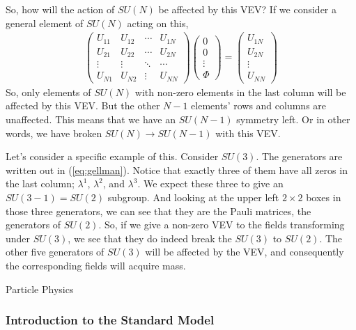 \documentclass[12pt,epsf]{article}
\makeatletter
\def\subsection{\@startsection{subsection}{2}{\z@}{2.3ex plus .2ex}
 {2.3ex plus .2ex}{\bf}}
\def\nolabel{\nonumber }
\def\nolabel{\nonumber }
\makeatother
\begin{document}
So, how will the action of $SU(N)$ be affected by this VEV?  If we
consider a general element of $SU(N)$ acting on this,
\begin{eqnarray}
\begin{pmatrix}
U_{11} & U_{12} & \cdots & U_{1N} \\
U_{21} & U_{22} & \cdots & U_{2N} \\
\vdots & \vdots & \ddots & \cdots \\
U_{N1} & U_{N2} & \vdots & U_{NN}
\end{pmatrix}
\begin{pmatrix}
0 \\ 0 \\ \vdots \\ \Phi
\end{pmatrix} = 
\begin{pmatrix}
U_{1N} \\ U_{2N} \\ \vdots \\ U_{NN}
\end{pmatrix}\nolabel
\end{eqnarray}
So, only elements of $SU(N)$ with non-zero elements in the last column
will be affected by this VEV.  But the other $N-1$ elements' rows and
columns are unaffected.  This means that we have an $SU(N-1)$ symmetry
left.  Or in other words, we have broken $SU(N)\rightarrow SU(N-1)$
with this VEV.  

Let's consider a specific example of this.  Consider $SU(3)$.  The
generators are written out in (\ref{eq:gellman}).  Notice that exactly
three of them have all zeros in the last column; $\lambda^1$,
$\lambda^2$, and $\lambda^3$.  We expect these three to give an
$SU(3-1)=SU(2)$ subgroup.  And looking at the upper left $2\times 2$
boxes in those three generators, we can see that they are the Pauli
matrices, the generators of $SU(2)$.  So, if we give a non-zero VEV
to the fields transforming under $SU(3)$, we see that they do indeed
break the $SU(3)$ to $SU(2)$.  The other five generators of $SU(3)$
will be affected by the VEV, and consequently the corresponding
fields will acquire mass.  

\subsection{Particle Physics}

\subsubsection{Introduction to the Standard Model}
\end{document}
